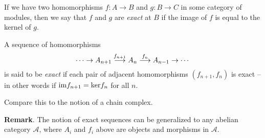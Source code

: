 \documentclass[12pt]{article}
\begin{document}
If we have two homomorphisms $f : A \to B$ and $g : B \to C$
in some category of modules,
then we say that $f$ and $g$ are {\it exact} at $B$
if the image of $f$ is equal to the kernel of $g$.

A sequence of homomorphisms
$$
  \cdots \rightarrow
  A_{n+1} \buildrel {f_{n+1}} \over \longrightarrow
  A_n \buildrel {f_n} \over \longrightarrow
  A_{n-1} \rightarrow
  \cdots
$$
is said to be {\it exact} if each pair
of adjacent homomorphisms $(f_{n+1}, f_n)$ is exact -- 
in other words if ${\rm im} f_{n+1} = {\rm ker} f_n$ for all $n$.

Compare this to the notion of a chain complex.

\textbf{Remark}.  The notion of exact sequences can be generalized to any abelian category $\mathcal{A}$, where $A_i$ and $f_i$ above are objects and morphisms in $\mathcal{A}$.
\end{document}
